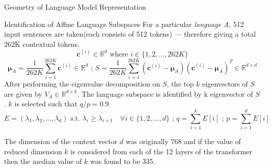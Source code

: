\documentclass{beamer}
\begin{document}
	\begin{frame}{Geometry of Language Model Representation}
		\begin{block}{\scriptsize Identification of Affine Language Subspaces}\scriptsize
			For a particular \emph{language A}, 512 input sentences are taken(each consists of 512 tokens) --- therefore giving a total 262K contextual tokens.
			\begin{equation}
				\mathbf{c}^{(i)} \in \mathbb{R}^d \text{ where } i \in \{1, 2, \dots , 262K\}
			\end{equation}
			\begin{equation}
				\bm{\mu}_A = \frac{1}{262K}\sum_{i=1}^{262K} \mathbf{c}^{(i)} \in \mathbb{R}^d \text{  ;  }
				S = \frac{1}{262K} \sum_{i = 1}^{262K} (\mathbf{c}^{(i)} - \bm{\mu}_A)(\mathbf{c}^{(i)} - \bm{\mu}_A)^T \in \mathbb{R}^{d \times d}
			\end{equation}
			After performing the eigenvalue decomposition on $S$, the top $k$ eigenvectors of $S$ are given by $V_A \in \mathbb{R}^{d \times k}$. The language subspace is identified by k eigenvector of $S$. $k$ is selected such that $q/p = 0.9$.
			\begin{equation}
				E = (\lambda_1, \lambda_2, \dots , \lambda_d) \text{ s.t. } \lambda_i \ge \lambda_{i+1} \quad \forall i \in \{1,2, \dots, d\} \text{    ;    }
				q = \sum_{i = 1}^{k} E[i] \text{    ;    }
				p = \sum_{i=1}^{d} E[i]
			\end{equation}
			
			The dimension of the context vector $d$ was originally 768 and if the value of reduced dimension $k$ is considered from each of the 12 layers of the transformer then the median value of $k$ was found to be 335.
		\end{block}
	\end{frame}
	
\end{document}
